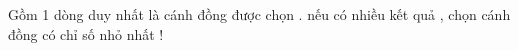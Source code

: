 Gồm 1 dòng duy nhất là cánh đồng được chọn . nếu có nhiều kết quả , chọn cánh đồng có chỉ số nhỏ nhất !